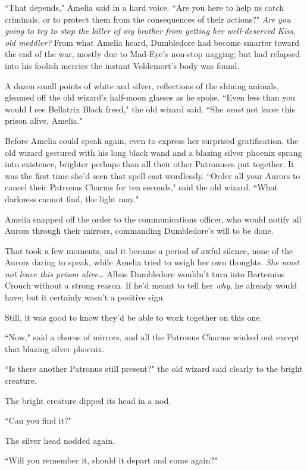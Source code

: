 ``That depends," Amelia said in a hard voice. ``Are you here to help us catch criminals, or to protect them from the consequences of their actions?" \emph{Are you going to try to stop the killer of my brother from getting her well-deserved Kiss, old meddler?} From what Amelia heard, Dumbledore had become smarter toward the end of the war, mostly due to Mad-Eye's non-stop nagging; but had relapsed into his foolish mercies the instant Voldemort's body was found.

A dozen small points of white and silver, reflections of the shining animals, gleamed off the old wizard's half-moon glasses as he spoke. ``Even less than you would I see Bellatrix Black freed," the old wizard said. ``She \emph{must} not leave this prison alive, Amelia."

Before Amelia could speak again, even to express her surprised gratification, the old wizard gestured with his long black wand and a blazing silver phoenix sprang into existence, brighter perhaps than all their other Patronuses put together. It was the first time she'd seen that spell cast wordlessly. ``Order all your Aurors to cancel their Patronus Charms for ten seconds," said the old wizard. ``What darkness cannot find, the light may."

Amelia snapped off the order to the communications officer, who would notify all Aurors through their mirrors, commanding Dumbledore's will to be done.

That took a few moments, and it became a period of awful silence, none of the Aurors daring to speak, while Amelia tried to weigh her own thoughts. \emph{She must not leave this prison alive{\ldots}} Albus Dumbledore wouldn't turn into Bartemius Crouch without a strong reason. If he'd meant to tell her \emph{why}, he already would have; but it certainly wasn't a positive sign.

Still, it was good to know they'd be able to work together on this one.

``Now," said a chorus of mirrors, and all the Patronus Charms winked out except that blazing silver phoenix.

``Is there another Patronus still present?" the old wizard said clearly to the bright creature.

The bright creature dipped its head in a nod.

``Can you find it?"

The silver head nodded again.

``Will you remember it, should it depart and come again?"

